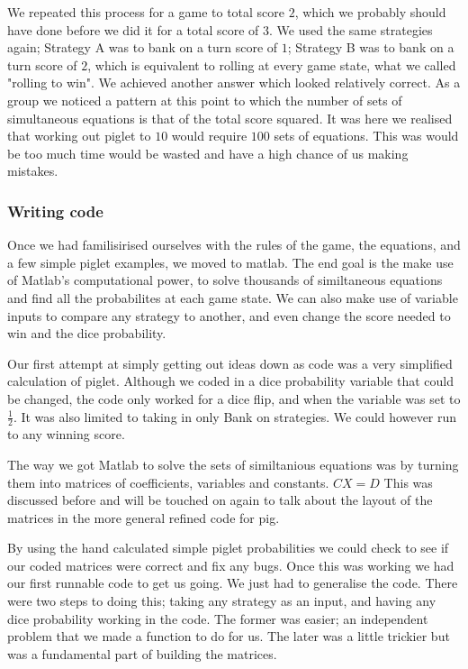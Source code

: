 \documentclass[a4paper,titlepage]{article}
\begin{document}
We repeated this process for a game to total score $2$, which we probably should have done before we did it for a total score of $3$.
We used the same strategies again; Strategy A was to bank on a turn score of $1$; Strategy B was to bank on a turn score of $2$, which is equivalent to rolling at every game state, what we called "rolling to win".
We achieved another answer which looked relatively correct. As a group we noticed a pattern at this point to which the number of sets of simultaneous equations is that of the total score squared.
It was here we realised that working out piglet to $10$ would require $100$ sets of equations. This was would be too much time would be wasted and have a high chance of us making mistakes.

\subsubsection{Writing code}
Once we had familisirised ourselves with the rules of the game, the equations, and
a few simple piglet examples, we moved to matlab.
The end goal is the make use of Matlab's computational power, to solve thousands of
similtaneous equations and find all the probabilites at each game state.
We can also make use of variable inputs to compare any strategy to another, and
even change the score needed to win and the dice probability.

Our first attempt at simply getting out ideas down as code was a very simplified
calculation of piglet. Although we coded in a dice probability variable that could be changed,
the code only worked for a dice flip, and when the variable was set to $\frac{1}{2}$.
It was also limited to taking in only Bank on strategies.
We could however run to any winning score.

The way we got Matlab to solve the sets of similtanious equations was by turning them into
matrices of coefficients, variables and constants. $CX=D$ This was discussed before
and will be touched on again to talk about the layout of the matrices in the more general
refined code for pig.

By using the hand calculated simple piglet probabilities we could check to see if our
coded matrices were correct and fix any bugs. Once this was working we had our first
runnable code to get us going. We just had to generalise the code.
There were two steps to doing this; taking any strategy as an input, and having any
dice probability working in the code. The former was easier; an independent problem that we
made a function to do for us. The later was a little trickier but was a fundamental part
of building the matrices.
\end{document}
